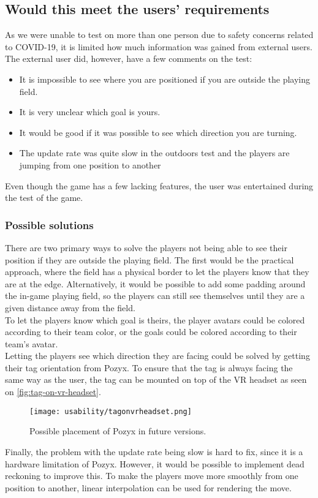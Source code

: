 \subsection{Would this meet the users' requirements}
As we were unable to test on more than one person due to safety concerns related to COVID-19, it is limited how much information was gained from external users.
The external user did, however, have a few comments on the test:

\begin{itemize}
    \item It is impossible to see where you are positioned if you are outside the playing field.
    \item It is very unclear which goal is yours.
    \item It would be good if it was possible to see which direction you are turning.
    \item The update rate was quite slow in the outdoors test and the players are jumping from one position to another
\end{itemize}
Even though the game has a few lacking features, the user was entertained during the test of the game.

\subsubsection{Possible solutions}
There are two primary ways to solve the players not being able to see their position if they are outside the playing field.
The first would be the practical approach, where the field has a physical border to let the players know that they are at the edge.
Alternatively, it would be possible to add some padding around the in-game playing field, so the players can still see themselves until they are a given distance away from the field.
\\
To let the players know which goal is theirs, the player avatars could be colored according to their team color, or the goals could be colored according to their team's avatar.
\\
Letting the players see which direction they are facing could be solved by getting their tag orientation from Pozyx.
To ensure that the tag is always facing the same way as the user, the tag can be mounted on top of the VR headset as seen on \autoref{fig:tag-on-vr-headset}.

\begin{figure}[H]
    \centering
    \texttt{[image: usability/tagonvrheadset.png]}
    \caption{Possible placement of Pozyx in future versions.}
    \label{fig:tag-on-vr-headset}
\end{figure}
\noindent
Finally, the problem with the update rate being slow is hard to fix, since it is a hardware limitation of Pozyx. However, it would be possible to implement dead reckoning to improve this.
To make the players move more smoothly from one position to another, linear interpolation can be used for rendering the move.
